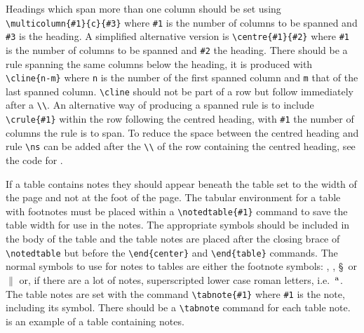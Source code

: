Headings
which span more than one column should be set using
\verb"\multicolumn{#1}{c}{#3}" where \verb"#1" is the number of columns to be
spanned and \verb"#3" is the heading. A simplified alternative version is
\verb"\centre{#1}{#2}" where \verb"#1" is the number of columns to be
spanned and \verb"#2" the heading.
There should be a rule spanning the same  
columns below the heading, it is produced with \verb"\cline{n-m}" 
where \verb"n" is the number of the first spanned column and \verb"m"
that of the last spanned column. \verb"\cline" should not be part of a row 
but follow immediately after a \verb"\\". 
An alternative way of producing a spanned
rule is to include \verb"\crule{#1}" within the row following the centred
heading, with \verb"#1" the number of columns the rule is to span. To reduce
the
space between the centred heading and rule \verb"\ns" can be added after the
\verb"\\" of the row containing the centred heading, see the code for
. 
 
If a table contains notes 
they should appear beneath the table set to the width of the page
and 
not at the foot of the page. 
The tabular environment for a table with footnotes must be 
placed within a \verb"\notedtable{#1}" command to save the table width for 
use in the notes.
The appropriate symbols should be included 
in the body of the table and the table notes are placed
after the closing brace
of \verb"\notedtable"
but before the \verb"\end{center}" and \verb"\end{table}" commands.
The normal symbols to use for notes to tables are either the 
footnote symbols: \dag, \ddag, \S\ or $\|$ or, if there are a lot of 
notes, superscripted lower case roman letters, i.e.\ $^{\text a}$.
The table notes are set with the command \verb"\tabnote{#1}" where 
\verb"#1" is 
the note, including its symbol. There should be a \verb"\tabnote" 
command for 
each table note.  is an example of a table containing notes.

